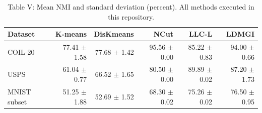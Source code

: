 \begin{table}[ht]
\centering
\caption{Table V: Mean NMI and standard deviation (percent). All methods executed in this repository.}
\begin{tabular}{lrrrrr}
\toprule
Dataset & K-means & DisKmeans & NCut & LLC-L & LDMGI \\
\midrule
COIL-20 & 77.41 $\pm$ 1.58 & 77.68 $\pm$ 1.42 & 95.56 $\pm$ 0.00 & 85.22 $\pm$ 0.83 & 94.00 $\pm$ 0.66 \\
USPS & 61.04 $\pm$ 0.77 & 66.52 $\pm$ 1.65 & 80.50 $\pm$ 0.00 & 89.89 $\pm$ 0.02 & 87.20 $\pm$ 1.73 \\
MNIST subset & 51.25 $\pm$ 1.88 & 52.69 $\pm$ 1.52 & 68.30 $\pm$ 0.02 & 75.26 $\pm$ 0.02 & 76.50 $\pm$ 0.95 \\
\bottomrule
\end{tabular}
\end{table}
